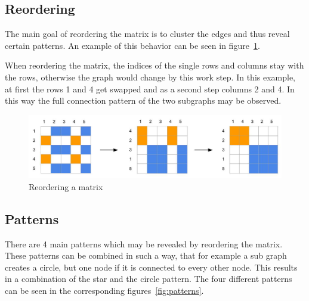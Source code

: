 \FloatBarrier
\subsection{Reordering}

The main goal of reordering the matrix is to cluster the edges and thus reveal certain patterns. An example of this behavior can be seen in figure~\ref{fig:reorder}. 


When reordering the matrix, the indices of the single rows and columns stay with the rows, otherwise the graph would change by this work step. In this example, at first the rows 1 and 4 get swapped and as a second step columns 2 and 4. In this way the full connection pattern of the two subgraphs may be observed. 


\begin{figure}[ht]
\includegraphics[width=\textwidth]{images/reorder}
\caption[Reordering a matrix]{Reordering a matrix\label{fig:reorder}}
\end{figure}

\FloatBarrier

\subsection{Patterns}

There are 4 main patterns which may be revealed by reordering the matrix. These patterns can be combined in such a way, that for example a sub graph creates a circle, but one node if it is connected to every other node. This results in a combination of the star and the circle pattern. 
The four different patterns can be seen in the corresponding figures~\ref{fig:patterns}.

